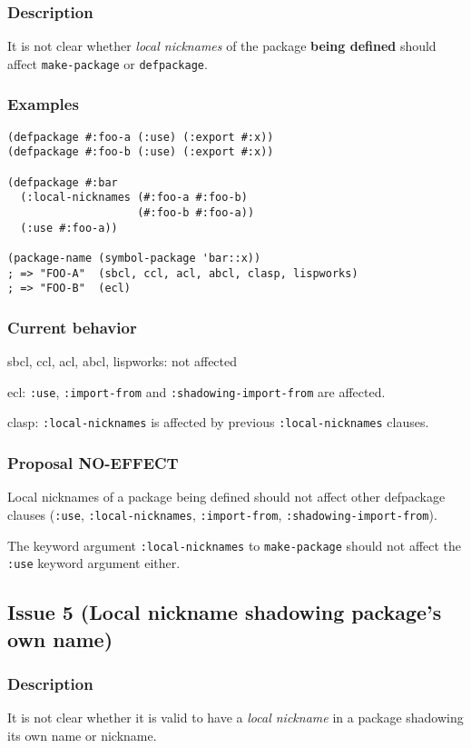 \documentclass[11pt]{article}
\begin{document}
\subsubsection{Description}
\label{sec:orgd81b29f}
It is not clear whether \emph{local nicknames} of the package \textbf{being defined} should
affect \texttt{make-package} or \texttt{defpackage}.
\subsubsection{Examples}
\label{sec:org390d799}
\begin{verbatim}
(defpackage #:foo-a (:use) (:export #:x))
(defpackage #:foo-b (:use) (:export #:x))

(defpackage #:bar
  (:local-nicknames (#:foo-a #:foo-b)
                    (#:foo-b #:foo-a))
  (:use #:foo-a))

(package-name (symbol-package 'bar::x))
; => "FOO-A"  (sbcl, ccl, acl, abcl, clasp, lispworks)
; => "FOO-B"  (ecl)
\end{verbatim}
\subsubsection{Current behavior}
\label{sec:org69d204c}
sbcl, ccl, acl, abcl, lispworks: not affected

ecl: \texttt{:use}, \texttt{:import-from} and \texttt{:shadowing-import-from} are affected.

clasp: \texttt{:local-nicknames} is affected by previous \texttt{:local-nicknames} clauses.
\subsubsection{Proposal NO-EFFECT}
\label{sec:org37f0a65}
Local nicknames of a package being defined should not affect other defpackage
clauses (\texttt{:use}, \texttt{:local-nicknames}, \texttt{:import-from}, \texttt{:shadowing-import-from}).

The keyword argument \texttt{:local-nicknames} to \texttt{make-package} should not affect the
\texttt{:use} keyword argument either.

\subsection{Issue 5 (Local nickname shadowing package's own name)}
\label{sec:orge690307}
\subsubsection{Description}
\label{sec:org99efcca}
It is not clear whether it is valid to have a \emph{local nickname} in a package
shadowing its own name or nickname.
\end{document}
